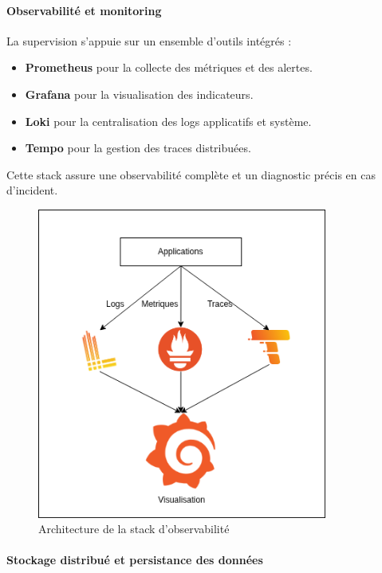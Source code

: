 {\paragraph{\textbf{Observabilité et monitoring}}

La supervision s'appuie sur un ensemble d’outils intégrés :

\begin{itemize}
	\item \textbf{Prometheus} pour la collecte des métriques et des alertes.
	\item \textbf{Grafana} pour la visualisation des indicateurs.
	\item \textbf{Loki} pour la centralisation des logs applicatifs et système.
	\item \textbf{Tempo} pour la gestion des traces distribuées.
\end{itemize}

Cette stack assure une observabilité complète et un diagnostic précis en cas d’incident.

\begin{figure}[H]
	\centering
	\includegraphics[width=0.85\textwidth]{figures/observabilite-stack.png}
	\caption{Architecture de la stack d'observabilité}
\end{figure}

\paragraph{\textbf{Stockage distribué et persistance des données}}

}
